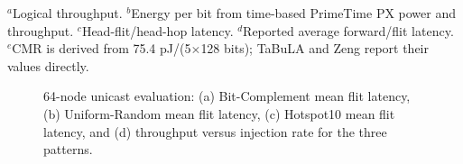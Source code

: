 \documentclass[conference]{IEEEtran}
\begin{document}
\begin{table}[!t]
\caption{Node-Level Comparison With Representative Asynchronous NoC Routers}
\label{tab:router-comparison}
\centering
\scriptsize
\setlength{\tabcolsep}{4.0pt}
\renewcommand{\arraystretch}{1.05}
\vspace{1mm}
\begin{minipage}{0.99\textwidth}
\footnotesize
$^{a}$Logical throughput. $^{b}$Energy per bit from time-based PrimeTime PX power and throughput.
$^{c}$Head-flit/head-hop latency. $^{d}$Reported average forward/flit latency.
$^{e}$CMR is derived from 75.4 pJ/(5$\times$128 bits); TaBuLA and Zeng report their values directly.
\end{minipage}
\end{table}

\setcounter{figure}{7}
\begin{figure}[!t]
\centering

\caption{64-node unicast evaluation: (a) Bit-Complement mean flit latency,
(b) Uniform-Random mean flit latency, (c) Hotspot10 mean flit latency, and
(d) throughput versus injection rate for the three patterns.}
\label{fig:64network}
\end{figure}
\end{document}
